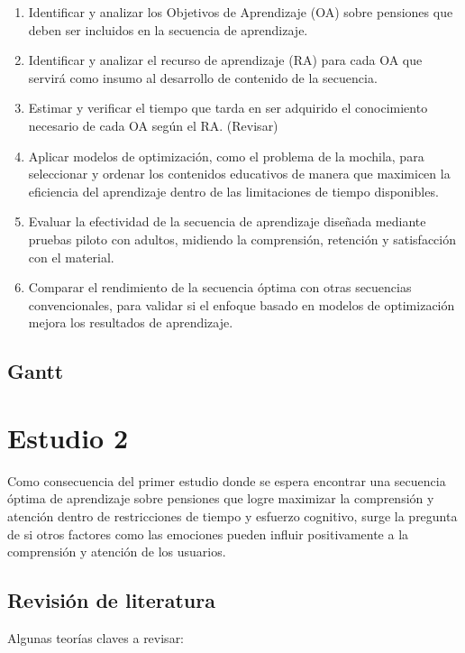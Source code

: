 \documentclass{article}
\begin{document}
\begin{enumerate}
    \item Identificar y analizar los Objetivos de Aprendizaje (OA) sobre pensiones que deben ser incluidos en la secuencia de aprendizaje.
    \item Identificar y analizar el recurso de aprendizaje (RA) para cada OA que servirá como insumo al desarrollo de contenido de la secuencia. 
    \item Estimar y verificar el tiempo que tarda en ser adquirido el conocimiento necesario de cada OA según el RA. (Revisar)
    \item Aplicar modelos de optimización, como el problema de la mochila, para seleccionar y ordenar los contenidos educativos de manera que maximicen la eficiencia del aprendizaje dentro de las limitaciones de tiempo disponibles.
    \item Evaluar la efectividad de la secuencia de aprendizaje diseñada mediante pruebas piloto con adultos, midiendo la comprensión, retención y satisfacción con el material.
    \item Comparar el rendimiento de la secuencia óptima con otras secuencias convencionales, para validar si el enfoque basado en modelos de optimización mejora los resultados de aprendizaje.
\end{enumerate}

\subsection{Gantt}


\section{Estudio 2}

Como consecuencia del primer estudio donde se espera encontrar una secuencia óptima de aprendizaje sobre pensiones que logre maximizar la comprensión y atención dentro de restricciones de tiempo y esfuerzo cognitivo, surge la pregunta de si otros factores como las emociones pueden influir positivamente a la comprensión y atención de los usuarios.

\subsection{Revisión de literatura}

Algunas teorías claves a revisar: 
\end{document}
